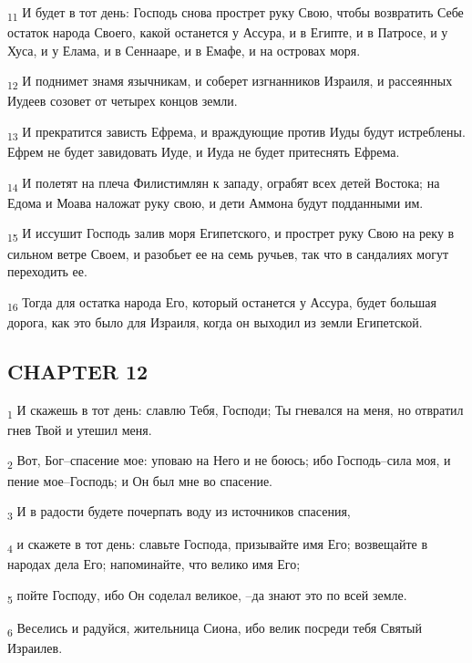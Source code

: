 \begin{tcolorbox}
\textsubscript{11} И будет в тот день: Господь снова прострет руку Свою, чтобы возвратить Себе остаток народа Своего, какой останется у Ассура, и в Египте, и в Патросе, и у Хуса, и у Елама, и в Сеннааре, и в Емафе, и на островах моря.
\end{tcolorbox}
\begin{tcolorbox}
\textsubscript{12} И поднимет знамя язычникам, и соберет изгнанников Израиля, и рассеянных Иудеев созовет от четырех концов земли.
\end{tcolorbox}
\begin{tcolorbox}
\textsubscript{13} И прекратится зависть Ефрема, и враждующие против Иуды будут истреблены. Ефрем не будет завидовать Иуде, и Иуда не будет притеснять Ефрема.
\end{tcolorbox}
\begin{tcolorbox}
\textsubscript{14} И полетят на плеча Филистимлян к западу, ограбят всех детей Востока; на Едома и Моава наложат руку свою, и дети Аммона будут подданными им.
\end{tcolorbox}
\begin{tcolorbox}
\textsubscript{15} И иссушит Господь залив моря Египетского, и прострет руку Свою на реку в сильном ветре Своем, и разобьет ее на семь ручьев, так что в сандалиях могут переходить ее.
\end{tcolorbox}
\begin{tcolorbox}
\textsubscript{16} Тогда для остатка народа Его, который останется у Ассура, будет большая дорога, как это было для Израиля, когда он выходил из земли Египетской.
\end{tcolorbox}
\subsection{CHAPTER 12}
\begin{tcolorbox}
\textsubscript{1} И скажешь в тот день: славлю Тебя, Господи; Ты гневался на меня, но отвратил гнев Твой и утешил меня.
\end{tcolorbox}
\begin{tcolorbox}
\textsubscript{2} Вот, Бог--спасение мое: уповаю на Него и не боюсь; ибо Господь--сила моя, и пение мое--Господь; и Он был мне во спасение.
\end{tcolorbox}
\begin{tcolorbox}
\textsubscript{3} И в радости будете почерпать воду из источников спасения,
\end{tcolorbox}
\begin{tcolorbox}
\textsubscript{4} и скажете в тот день: славьте Господа, призывайте имя Его; возвещайте в народах дела Его; напоминайте, что велико имя Его;
\end{tcolorbox}
\begin{tcolorbox}
\textsubscript{5} пойте Господу, ибо Он соделал великое, --да знают это по всей земле.
\end{tcolorbox}
\begin{tcolorbox}
\textsubscript{6} Веселись и радуйся, жительница Сиона, ибо велик посреди тебя Святый Израилев.
\end{tcolorbox}
